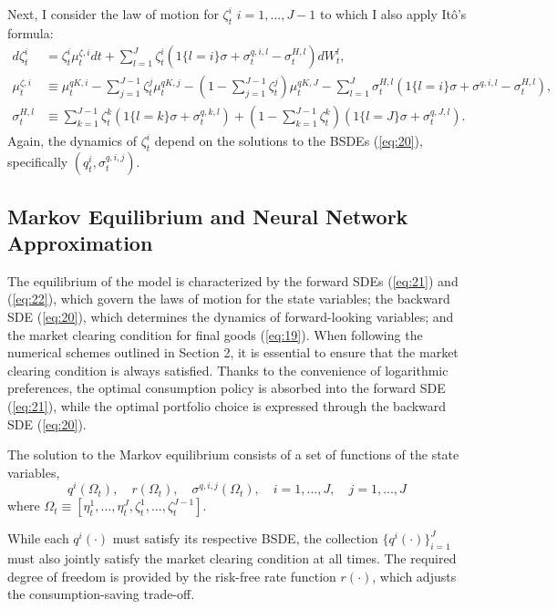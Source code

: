 \documentclass{article}
\begin{document}
\clearpage

Next, I consider the law of motion for $\zeta_{t}^{i}$ $i=1,...,J-1$ to which I also apply Itô's formula:
\begin{equation}
\begin{aligned}
d\zeta_{t}^{i}&=\zeta_{t}^{i}\mu_{t}^{\zeta,i}dt+\sum_{l=1}^{J}\zeta_{t}^{i}(1\{l=i\}\sigma+\sigma_{t}^{q,i,l}-\sigma_{t}^{H,l})dW_{t}^{l}, \\
\mu_{t}^{\zeta,i}&\equiv\mu_{t}^{qK,i}-\sum_{j=1}^{J-1}\zeta_{t}^{j}\mu_{t}^{qK,j}-(1-\sum_{j=1}^{J-1}\zeta_{t}^{j})\mu_{t}^{qK,J}-\sum_{l=1}^{J}\sigma_{t}^{H,l}(1\{l=i\}\sigma+\sigma^{q,i,l}-\sigma_{t}^{H,l}), \\
\sigma_{t}^{H,l}&\equiv\sum_{k=1}^{J-1}\zeta_{t}^{k}(1\{l=k\}\sigma+\sigma_{t}^{q,k,l})+(1-\sum_{k=1}^{J-1}\zeta_{t}^{k})(1\{l=J\}\sigma+\sigma_{t}^{q,J,l}).
\end{aligned}
\label{eq:22}
\end{equation}
Again, the dynamics of $\zeta_{t}^{i}$ depend on the solutions to the BSDEs (\ref{eq:20}), specifically $(q_{t}^{i},\sigma_{t}^{q,i,j})$.

\subsection{Markov Equilibrium and Neural Network Approximation}

The equilibrium of the model is characterized by the forward SDEs (\ref{eq:21}) and (\ref{eq:22}), which govern the laws of motion for the state variables; the backward SDE (\ref{eq:20}), which determines the dynamics of forward-looking variables; and the market clearing condition for final goods (\ref{eq:19}). When following the numerical schemes outlined in Section 2, it is essential to ensure that the market clearing condition is always satisfied. Thanks to the convenience of logarithmic preferences, the optimal consumption policy is absorbed into the forward SDE (\ref{eq:21}), while the optimal portfolio choice is expressed through the backward SDE (\ref{eq:20}).

The solution to the Markov equilibrium consists of a set of functions of the state variables,
\[
q^{i}(\Omega_{t}), \quad r(\Omega_{t}), \quad \sigma^{q,i,j}(\Omega_{t}), \quad i=1,...,J, \quad j=1,...,J
\]
where $\Omega_{t}\equiv[\eta_{t}^{1},...,\eta_{t}^{J},\zeta_{t}^{1},...,\zeta_{t}^{J-1}]$.

While each $q^{i}(\cdot)$ must satisfy its respective BSDE, the collection $\{q^{i}(\cdot)\}_{i=1}^{J}$ must also jointly satisfy the market clearing condition at all times. The required degree of freedom is provided by the risk-free rate function $r(\cdot)$, which adjusts the consumption-saving trade-off.
\end{document}
